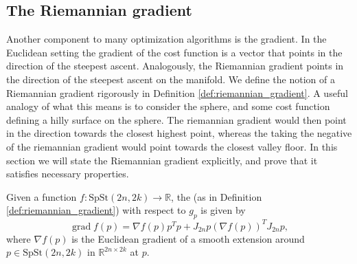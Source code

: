 \subsection{The Riemannian gradient}
Another component to many optimization algorithms is the gradient. In the Euclidean setting the gradient of the cost function is a vector that points in the direction of the steepest ascent. Analogously, the Riemannian gradient points in the direction of the steepest ascent on the manifold. We define the notion of a Riemannian gradient rigorously in Definition \ref{def:riemannian_gradient}. A useful analogy of what this means is to consider the sphere, and some cost function defining a hilly surface on the sphere. The riemannian gradient would then point in the direction towards the closest highest point, whereas the taking the negative of the riemannian gradient would point towards the closest valley floor. In this section we will state the Riemannian gradient explicitly, and prove that it satisfies necessary properties. 
\begin{proposition}
    Given a function $f\colon \mathrm{SpSt}(2n, 2k)\xrightarrow{}\mathbb{R}$, the  (as in Definition \ref{def:riemannian_gradient}) with respect to $g_{p}$ is given by
    \begin{equation}\label{eq:rie_grad}
        \operatorname{grad}f(p)=\nabla f(p)p^{T}p+J_{2n}p(\nabla f(p))^{T}J_{2n}p,
    \end{equation}
    where $\nabla f(p)$ is the Euclidean gradient of a smooth extension around $p\in \mathrm{SpSt}(2n, 2k)$ in $\mathbb{R}^{2n\times2k}$ at $p$.
\end{proposition}
